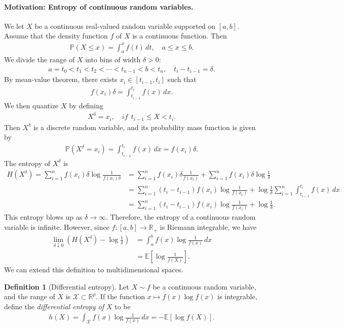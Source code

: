 \documentclass{article}
\numberwithin{equation}{section}
\newcommand{\E}{\mathbb{E}}
\newcommand{\bbP}{\mathbb{P}}
\newcommand{\bbR}{\mathbb{R}}
\renewcommand{\cal}{\mathcal}
\theoremstyle{plain}
\theoremstyle{definition}
\newtheorem{definition}[theorem]{Definition}
\begin{document}
\paragraph{Motivation: Entropy of continuous random variables.} We let $X$ be a continuous real-valued random variable supported on $[a,b]$. Assume that the density function $f$ of $X$ is a continuous function. Then
\begin{align*}
	\bbP(X\leq x)=\int_a^x f(t)\,dt,\quad a\leq x\leq b.
\end{align*}
We divide the range of $X$ into bins of width $\delta>0$:
\begin{align*}
	a=t_0<t_1<t_2<\cdots<t_{n-1}<b<t_n,\quad t_i-t_{i-1}=\delta.
\end{align*}
By mean-value theorem, there exists $x_i\in[t_{i-1},t_i]$ such that
\begin{align*}
	f(x_i)\delta=\int_{t_{i-1}}^{t_i}f(x)\,dx.
\end{align*}
We then quantize $X$ by defining
\begin{align*}
	X^\delta=x_i,\quad if\ \ t_{i-1}\leq X < t_i.
\end{align*}
Then $X^\delta$ is a discrete random variable, and its probability mass function is given by
\begin{align*}
	\bbP(X^\delta=x_i)=\int_{t_{i-1}}^{t_i}f(x)\,dx=f(x_i)\delta.
\end{align*}
The entropy of $X^\delta$ is
\begin{align*}
	H(X^\delta)=\sum_{i=1}^n f(x_i)\delta\log\frac{1}{f(x_i)\delta}&=\sum_{i=1}^n f(x_i)\delta\frac{1}{f(x_i)}+\sum_{i=1}^n f(x_i)\delta\log\frac{1}{\delta}\\
	&=\sum_{i=1}^n(t_i-t_{i-1}) f(x_i)\log\frac{1}{f(x_i)}+\log\frac{1}{\delta}\sum_{i=1}^n \int_{t_{i-1}}^{t_i}f(x)\,dx\\
	&=\sum_{i=1}^n(t_i-t_{i-1}) f(x_i)\log\frac{1}{f(x_i)}+\log\frac{1}{\delta}.
\end{align*}
This entropy blows up as $\delta\to\infty$. Therefore, the entropy of a continuous random variable is infinite. However, since $f:[a,b]\to\bbR_+$ is Riemann integrable, we have
\begin{align*}
	\lim_{\delta\downarrow 0}\left(H(X^\delta)-\log\frac{1}{\delta}\right)&=\int_a^b f(x)\log\frac{1}{f(x)}\,dx\\
	&=\E\left[\log\frac{1}{f(X)}\right].
\end{align*}
We can extend this definition to multidimensional spaces.

\begin{definition}[Differential entropy]\label{diffentropy}
Let $X\sim f$ be a continuous random variable, and the range of $X$ is $\cal{X}\subset\bbR^p$. If the function $x\mapsto f(x)\log f(x)$ is integrable, define the \textit{differential entropy of $X$} to be
\begin{align*}
	h(X)=\int_{\cal{X}} f(x)\log\frac{1}{f(x)}\,dx=-\E\left[\log f(X)\right].
\end{align*}
\end{definition}
\end{document}
